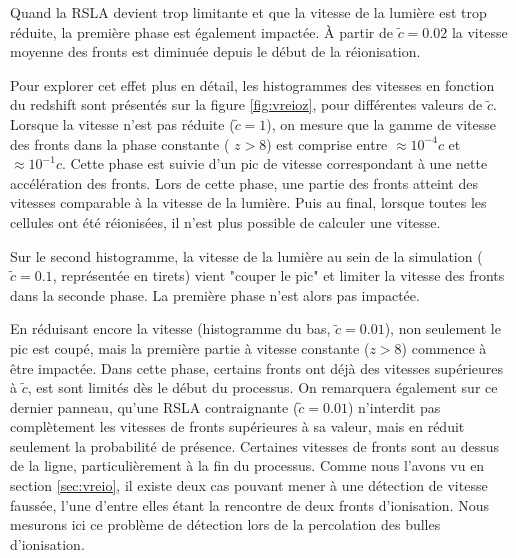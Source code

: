 Quand la \ac{RSLA} devient trop limitante et que la vitesse de la lumière est trop réduite, la première phase est également impactée.
À partir de $\tilde{c}=0.02$ la vitesse moyenne des fronts est diminuée depuis le début de la réionisation.

Pour explorer cet effet plus en détail, les histogrammes des vitesses en fonction du redshift sont présentés sur la figure \ref{fig:vreioz}, pour différentes valeurs de $\tilde{c}$.
Lorsque la vitesse n'est pas réduite ($\tilde{c}=1$), on mesure que la gamme de vitesse des fronts dans la phase constante ( $z>8$) est comprise entre $\approx 10^{-4}c$ et $\approx 10^{-1}c$.
Cette phase est suivie d'un pic de vitesse correspondant à une nette accélération des fronts.
Lors de cette phase, une partie des fronts atteint des vitesses comparable à la vitesse de la lumière.
Puis au final, lorsque toutes les cellules ont été réionisées, il n'est plus possible de calculer une vitesse.

Sur le second histogramme, la vitesse de la lumière au sein de la simulation ($\tilde{c}=0.1$, représentée en tirets) vient "couper le pic" et limiter la vitesse des fronts dans la seconde phase.
La première phase n'est alors pas impactée.


En réduisant encore la vitesse (histogramme du bas, $\tilde{c}=0.01$), non seulement le pic est coupé, mais la première partie à vitesse constante ($z>8$) commence à être impactée.
Dans cette phase, certains fronts ont déjà des vitesses supérieures à $\tilde{c}$, est sont limités dès le début du processus.
On remarquera également sur ce dernier panneau, qu'une \ac{RSLA} contraignante ($\tilde{c}=0.01$) n'interdit pas complètement les vitesses de fronts supérieures à sa valeur, mais en réduit seulement la probabilité de présence.
Certaines vitesses de fronts sont au dessus de la ligne, particulièrement à la fin du processus.
Comme nous l'avons vu en section \ref{sec:vreio}, il existe deux cas pouvant mener à une détection de vitesse faussée, l'une d'entre elles étant la rencontre de deux fronts d'ionisation.
Nous mesurons ici ce problème de détection lors de la percolation des bulles d'ionisation.


